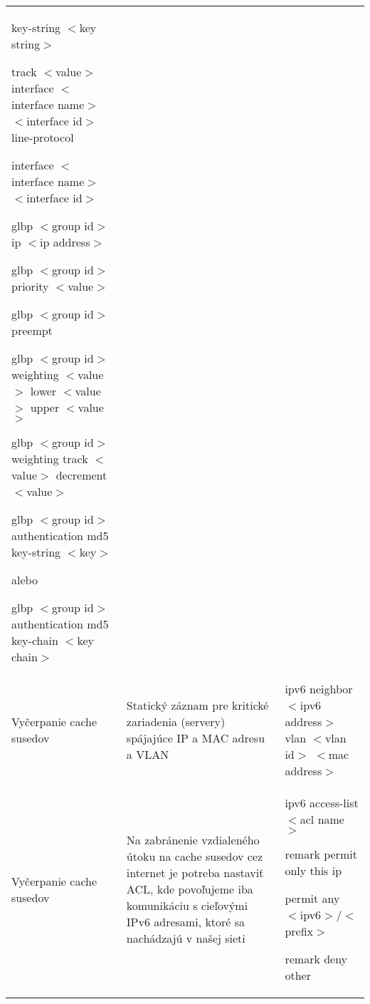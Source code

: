 \begin{longtable}[!htbp]{|L{10em}L{10em}>{\selectfont}L{34em}|}
	\hspace{1em}key-string $<$key string$>$
	
	track $<$value$>$ interface $<$interface name$>$ $<$interface id$>$ line-protocol
	
	interface $<$interface name$>$ $<$interface id$>$
	
	\hspace{0.5em}glbp $<$group id$>$ ip $<$ip  address$>$
	
	\hspace{0.5em}glbp $<$group id$>$ priority $<$value$>$
	
	\hspace{0.5em}glbp $<$group id$>$ preempt
	
	\hspace{0.5em}glbp $<$group id$>$ weighting $<$value$>$ lower $<$value$>$ upper $<$value$>$ 
	
	\hspace{0.5em}glbp $<$group id$>$ weighting track $<$value$>$ decrement $<$value$>$
	
	\hspace{0.5em}glbp $<$group id$>$ authentication md5 key-string $<$key$>$
	
	\vspace{0.5em}
	{\selectfont alebo}
	\vspace{0.5em}
	
	\hspace{0.5em}glbp $<$group id$>$ authentication md5 key-chain $<$key chain$>$\\
	
	
	
	
	Vyčerpanie cache susedov	&Statický záznam pre kritické zariadenia (servery) spájajúce IP a MAC adresu a VLAN
	&ipv6 neighbor $<$ipv6 address$>$ vlan $<$vlan id$>$ $<$mac address$>$\\
	
	
	
	
	Vyčerpanie cache susedov	&Na zabránenie vzdialeného útoku na cache susedov cez internet je potreba nastaviť ACL, kde povoľujeme iba komunikáciu s cieľovými IPv6 adresami, ktoré sa nachádzajú v našej sieti	&ipv6 access-list $<$acl name$>$
	
	\hspace{0.5em}remark permit only this ip  
	
	\hspace{0.5em}permit any $<$ipv6$>$/$<$prefix$>$
	
	\hspace{0.5em}remark deny other
	

\end{longtable}
